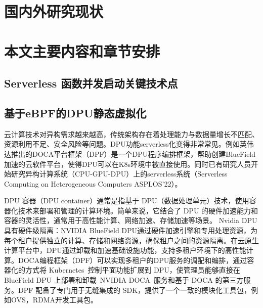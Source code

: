 \section{国内外研究现状}

\section{本文主要内容和章节安排}



 


\subsection{Serverless 函数并发启动关键技术点}

\subsection{基于eBPF的DPU静态虚拟化}

云计算技术对异构需求越来越高，传统架构存在着处理能力与数据量增长不匹配、资源利用不足、安全风险等问题。DPU功能serverless化变得非常常见。例如英伟达推出的DOCA平台框架（DPF）是一个DPU程序编排框架，帮助创建BlueField加速的云软件平台，使得DPU可以在K8s环境中被直接使用。同时已有研究人员开始研究异构计算系统（CPU-GPU-DPU）上的serverless系统（Serverless Computing on Heterogeneous Computers ASPLOS’22）。

DPU 容器（DPU container）通常是指基于 DPU（数据处理单元）技术，使用容器化技术来部署和管理的计算环境。简单来说，它结合了 DPU 的硬件加速能力和容器的灵活性，通常用于高性能计算、网络加速、存储加速等场景。
Nvidia DPU具有硬件级隔离：NVIDIA BlueField DPU通过硬件加速引擎和专用处理资源，为每个租户提供独立的计算、存储和网络资源，确保租户之间的资源隔离。在云原生计算平台中，DPU通过卸载和加速基础设施功能，支持多租户环境下的高性能计算。DOCA编程框架（DPF）可以实现多租户的DPU服务的调配和编排，通过容器化的方式将 Kubernetes 控制平面功能扩展到 DPU，使管理员能够直接在 BlueField DPU 上部署和卸载 NVIDIA DOCA 服务和基于 DOCA 的第三方服务。DPF 配备了专门用于无缝集成的 SDK，提供了一个一致的模块化工具包，例如OVS，RDMA开发工具包。

